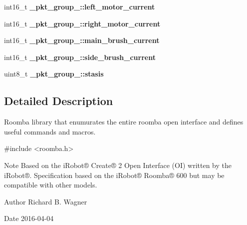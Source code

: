 \begin{DoxyCompactItemize}
\item 
\hypertarget{group__roomba-lib_ga1a8fd8fdbde5ae27c089a7d7ec1bc43a}{}int16\+\_\+t {\bfseries \+\_\+pkt\+\_\+group\+\_\+::left\+\_\+motor\+\_\+current}\label{group__roomba-lib_ga1a8fd8fdbde5ae27c089a7d7ec1bc43a}

\item 
\hypertarget{group__roomba-lib_gaeb30e39724a737ddec26de7fa00c837f}{}int16\+\_\+t {\bfseries \+\_\+pkt\+\_\+group\+\_\+::right\+\_\+motor\+\_\+current}\label{group__roomba-lib_gaeb30e39724a737ddec26de7fa00c837f}

\item 
\hypertarget{group__roomba-lib_ga0135c0b235c3206d5f666f0c595ed366}{}int16\+\_\+t {\bfseries \+\_\+pkt\+\_\+group\+\_\+::main\+\_\+brush\+\_\+current}\label{group__roomba-lib_ga0135c0b235c3206d5f666f0c595ed366}

\item 
\hypertarget{group__roomba-lib_gace7e4ea4d207869a25a51ac94a52eb9f}{}int16\+\_\+t {\bfseries \+\_\+pkt\+\_\+group\+\_\+::side\+\_\+brush\+\_\+current}\label{group__roomba-lib_gace7e4ea4d207869a25a51ac94a52eb9f}

\item 
\hypertarget{group__roomba-lib_ga0ed18b08023ce3926077caf11e77592a}{}uint8\+\_\+t {\bfseries \+\_\+pkt\+\_\+group\+\_\+::stasis}\label{group__roomba-lib_ga0ed18b08023ce3926077caf11e77592a}

\end{DoxyCompactItemize}


\subsection{Detailed Description}
Roomba library that enumurates the entire roomba open interface and defines useful commands and macros. 


\begin{DoxyCode}
\textcolor{preprocessor}{#include <roomba.h>} 
\end{DoxyCode}


\begin{DoxyNote}{Note}
Based on the i\+Robot® Create® 2 Open Interface (O\+I) written by the i\+Robot®. Specification based on the i\+Robot® Roomba® 600 but may be compatible with other models.
\end{DoxyNote}
\begin{DoxyAuthor}{Author}
Richard B. Wagner 
\end{DoxyAuthor}
\begin{DoxyDate}{Date}
2016-\/04-\/04 
\end{DoxyDate}


